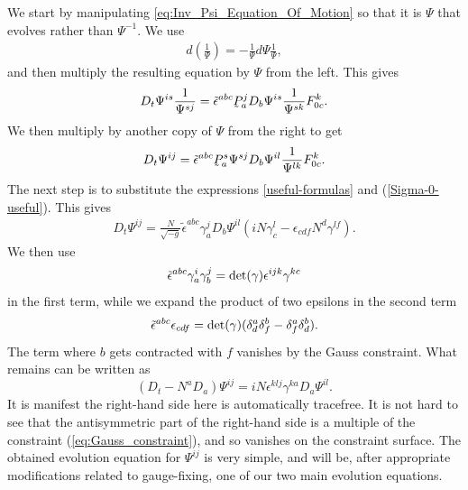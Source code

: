 \documentclass[10pt]{report}
\newcommand{\utilde}[1]{\underaccent{\tilde}{#1}}
\theoremstyle{definition}
\newcommand{\im}{i}
\begin{document}
We start by manipulating \cref{eq:Inv_Psi_Equation_Of_Motion} so that it is $\Psi$ that evolves rather than $\Psi^{-1}$. We use
\begin{align}
d\left(\frac{1}{\Psi}\right) = - \frac{1}{\Psi}d\Psi \frac{1}{\Psi} ,
\end{align}
and then multiply the resulting equation by $\Psi$ from the left. This gives
\begin{align}
D_t \Psi^{is} \frac{1}{\Psi^{sj}} = \tilde{\epsilon}^{abc} \utilde{P}^j_a D_b \Psi^{is} \frac{1}{\Psi^{sk}} F^k_{0c}.
\end{align}
We then multiply by another copy of $\Psi$ from the right to get
\begin{align}
D_t \Psi^{ij} = \tilde{\epsilon}^{abc} \utilde{P}^s_a \Psi^{sj} D_b \Psi^{il} \frac{1}{\Psi^{lk}} F^k_{0c}.
\end{align}
The next step is to substitute the expressions \cref{useful-formulas} and (\ref{Sigma-0-useful}). This gives
\begin{align}
D_t \Psi^{ij} = \frac{N}{\sqrt{-g}} \tilde{\epsilon}^{abc} \gamma^j_a  D_b \Psi^{il} 
 (\im N \gamma^l_c - \epsilon_{cdf} N^d \gamma^{l f}).
 \end{align}
 We then use 
 \begin{align}
\tilde{\epsilon}^{abc} \gamma^i_a \gamma^j_b = {\rm det}(\gamma) \epsilon^{ijk} \gamma^{kc}
 \end{align}
in the first term, while we expand the product of two epsilons in the second term
\begin{align}
\tilde{\epsilon}^{abc} \epsilon_{cdf} = {\rm det}(\gamma) (\delta^a_d \delta^b_f - \delta^a_f\delta^b_d).
\end{align}
The term where $b$ gets contracted with $f$ vanishes by the Gauss constraint. What remains can be written as 
\begin{equation}
    (D_t - N^a D_a) \Psi^{ij} = i N \epsilon^{klj}\gamma^{ka} D_a \Psi^{il}.
    \label{eq:Psi_evolution_equation}
\end{equation}
It is manifest the right-hand side here is automatically tracefree. It is not hard to see that the antisymmetric part of the right-hand side is a multiple of the constraint  (\ref{eq:Gauss_constraint}), and so vanishes on the constraint surface. The obtained evolution equation for $\Psi^{ij}$ is very simple, and will be, after appropriate modifications related to gauge-fixing, one of our two main evolution equations. 
\end{document}
